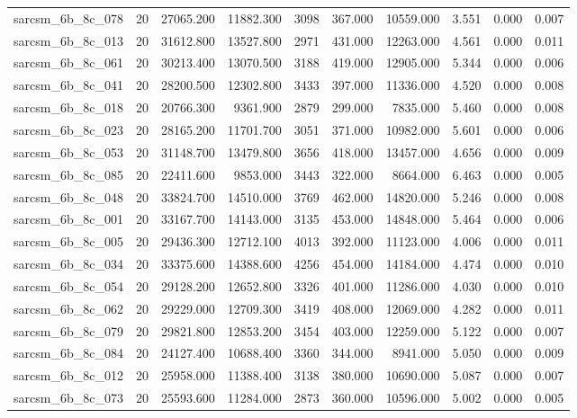 \begin{tabular}{lrrrrrrrrr}
sarcsm\_6b\_8c\_078 & 20 & 27065.200 & 11882.300 & 3098 & 367.000 & 10559.000 & 3.551 & 0.000 & 0.007 \\
sarcsm\_6b\_8c\_013 & 20 & 31612.800 & 13527.800 & 2971 & 431.000 & 12263.000 & 4.561 & 0.000 & 0.011 \\
sarcsm\_6b\_8c\_061 & 20 & 30213.400 & 13070.500 & 3188 & 419.000 & 12905.000 & 5.344 & 0.000 & 0.006 \\
sarcsm\_6b\_8c\_041 & 20 & 28200.500 & 12302.800 & 3433 & 397.000 & 11336.000 & 4.520 & 0.000 & 0.008 \\
sarcsm\_6b\_8c\_018 & 20 & 20766.300 & 9361.900 & 2879 & 299.000 & 7835.000 & 5.460 & 0.000 & 0.008 \\
sarcsm\_6b\_8c\_023 & 20 & 28165.200 & 11701.700 & 3051 & 371.000 & 10982.000 & 5.601 & 0.000 & 0.006 \\
sarcsm\_6b\_8c\_053 & 20 & 31148.700 & 13479.800 & 3656 & 418.000 & 13457.000 & 4.656 & 0.000 & 0.009 \\
sarcsm\_6b\_8c\_085 & 20 & 22411.600 & 9853.000 & 3443 & 322.000 & 8664.000 & 6.463 & 0.000 & 0.005 \\
sarcsm\_6b\_8c\_048 & 20 & 33824.700 & 14510.000 & 3769 & 462.000 & 14820.000 & 5.246 & 0.000 & 0.008 \\
sarcsm\_6b\_8c\_001 & 20 & 33167.700 & 14143.000 & 3135 & 453.000 & 14848.000 & 5.464 & 0.000 & 0.006 \\
sarcsm\_6b\_8c\_005 & 20 & 29436.300 & 12712.100 & 4013 & 392.000 & 11123.000 & 4.006 & 0.000 & 0.011 \\
sarcsm\_6b\_8c\_034 & 20 & 33375.600 & 14388.600 & 4256 & 454.000 & 14184.000 & 4.474 & 0.000 & 0.010 \\
sarcsm\_6b\_8c\_054 & 20 & 29128.200 & 12652.800 & 3326 & 401.000 & 11286.000 & 4.030 & 0.000 & 0.010 \\
sarcsm\_6b\_8c\_062 & 20 & 29229.000 & 12709.300 & 3419 & 408.000 & 12069.000 & 4.282 & 0.000 & 0.011 \\
sarcsm\_6b\_8c\_079 & 20 & 29821.800 & 12853.200 & 3454 & 403.000 & 12259.000 & 5.122 & 0.000 & 0.007 \\
sarcsm\_6b\_8c\_084 & 20 & 24127.400 & 10688.400 & 3360 & 344.000 & 8941.000 & 5.050 & 0.000 & 0.009 \\
sarcsm\_6b\_8c\_012 & 20 & 25958.000 & 11388.400 & 3138 & 380.000 & 10690.000 & 5.087 & 0.000 & 0.007 \\
sarcsm\_6b\_8c\_073 & 20 & 25593.600 & 11284.000 & 2873 & 360.000 & 10596.000 & 5.002 & 0.000 & 0.005 \\

\end{tabular}
